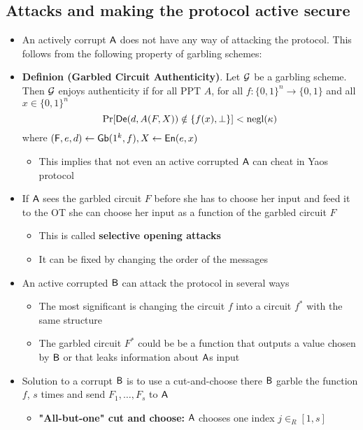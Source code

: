 \subsection{Attacks and making the protocol active secure}%
\begin{itemize}
    \item An actively corrupt $\mathsf{A}$ does not have any way of attacking the protocol. This follows from the following property of garbling schemes:
    \item \textbf{Definion (Garbled Circuit Authenticity)}. Let $\mathcal G$ be a garbling scheme. Then $\mathcal G$ enjoys authenticity if for all PPT $A$, for all $f: \{0,1\}^n \to \{0,1\}$ and all $x \in \{0,1\}^n$
    \begin{equation*}
        \Pr[\mathsf{De}(d, A(F, X)) \notin \{f(x), \bot\}] < \text{negl}(\kappa)
    \end{equation*}
    where $(\mathsf{F}, e, d) \leftarrow \mathsf{Gb}(1^k, f), X \leftarrow \mathsf{En}(e,x)$
    \begin{itemize}
        \item This implies that not even an active corrupted $\mathsf{A}$ can cheat in Yaos protocol
    \end{itemize}
    \item If $\mathsf{A}$ sees the garbled circuit $F$ before she has to choose her input and feed it to the OT she can choose her input as a function of the garbled circuit $F$
    \begin{itemize}
        \item This is called \textbf{selective opening attacks} 
        \item It can be fixed by changing the order of the messages
    \end{itemize}
    \item An active corrupted $\mathsf{B}$ can attack the protocol in several ways
    \begin{itemize}
        \item The most significant is changing the circuit $f$ into a circuit $f^*$ with the same structure
        \item The garbled circuit $F^*$ could be be a function that outputs a value chosen by $\mathsf{B}$ or that leaks information about $\mathsf{A}$s input
    \end{itemize}
    \item Solution to a corrupt $\mathsf{B}$ is to use a cut-and-choose there $\mathsf{B}$ garble the function $f$, $s$ times and send $F_1, \dots, F_s$ to $\mathsf{A}$
    \begin{itemize}
        \item \textbf{"All-but-one" cut and choose:} $\mathsf{A}$ chooses one index $j \in_R [1,s]$

\end{itemize}
\end{itemize}
